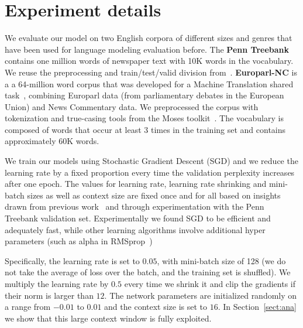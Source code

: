 \section{Experiment details}
We evaluate our model on two English corpora of different sizes and
genres that have been used for language modeling evaluation
before. The {\bf Penn Treebank} contains one million words of
newspaper text with 10K words in the vocabulary. We reuse the
preprocessing and train/test/valid division
from~\cite{mikolov2014learning}. 
{\bf Europarl-NC} is a a 64-million word corpus that was developed for
a Machine Translation shared task~\cite{bojar-EtAl:2015:WMT},
combining Europarl data (from parliamentary debates in the European
Union) and News Commentary data.  We preprocessed the corpus with
tokenization and true-casing tools from the Moses
toolkit~\cite{koehn2007moses}. The vocabulary is composed of words
that occur at least 3 times in the training set and contains
approximately 60K words. %

We train our models using Stochastic Gradient Descent (SGD) and we
reduce the learning rate by a fixed proportion every time the
validation perplexity increases after one epoch. The values for learning rate,
learning rate shrinking 
and mini-batch sizes as well as context size are
fixed once and for all based on insights drawn from previous
work~\cite{le2011structured,sukhbaatar2015end,devlin2014fast} and
through experimentation with the Penn Treebank validation set. Experimentally we found SGD to be efficient and adequately fast, while other learning algorithms involve additional hyper parameters (such as alpha in RMSprop~\cite{tieleman2012lecture})

Specifically, the learning rate is set to $0.05$, with mini-batch size
of 128 (we do not take the average of loss over the batch, and the
training set is shuffled). We multiply the learning rate by $0.5$
every time we shrink it and clip the gradients if their norm is larger
than $12$. The network parameters are initialized randomly on a range
from $-0.01$ to $0.01$ and the context size is set to $16$. In
Section~\ref{sect:ana} we show that this large context window is fully
exploited. 

